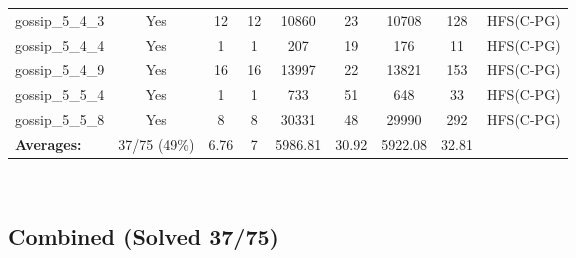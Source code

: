 \documentclass{article}
\begin{document}
\begin{tabular}{lcccccccc}
gossip\_5\_4\_3 & Yes & 12 & 12 & 10860 & 23 & 10708 & 128 & HFS(C-PG) \\
gossip\_5\_4\_4 & Yes & 1 & 1 & 207 & 19 & 176 & 11 & HFS(C-PG) \\
gossip\_5\_4\_9 & Yes & 16 & 16 & 13997 & 22 & 13821 & 153 & HFS(C-PG) \\
gossip\_5\_5\_4 & Yes & 1 & 1 & 733 & 51 & 648 & 33 & HFS(C-PG) \\
gossip\_5\_5\_8 & Yes & 8 & 8 & 30331 & 48 & 29990 & 292 & HFS(C-PG) \\
\textbf{Averages:} & 37/75 (49\%) & 6.76 & 7 & 5986.81 & 30.92 & 5922.08 & 32.81 & \\
\bottomrule
\end{tabular}
\\[0.7cm]
\subsection*{Combined (Solved 37/75)}
\end{document}
